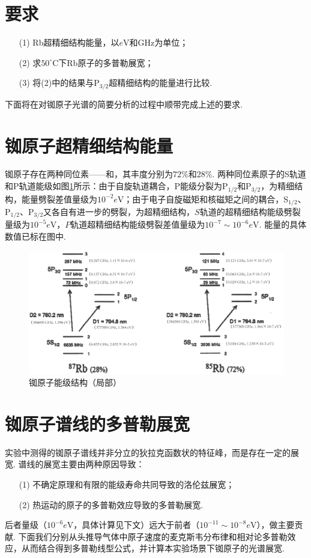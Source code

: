 \documentclass{assignment}
\begin{document}
\section*{要求}
\begin{itemize}
    \item[(1)] Rb超精细结构能量，以$e$V和GHz为单位；
    \item[(2)] 求$50^{\circ}$C下Rb原子的多普勒展宽；
    \item[(3)] 将(2)中的结果与P$_{3/2}$超精细结构的能量进行比较.
\end{itemize}
下面将在对铷原子光谱的简要分析的过程中顺带完成上述的要求.

\section{铷原子超精细结构能量}
铷原子存在两种同位素——和，其丰度分别为$72\%$和$28\%$. 两种同位素原子的S轨道和P轨道能级如图\ref{Rb-energy-level}所示：由于自旋轨道耦合，P能级分裂为P$_{1/2}$和P$_{3/2}$，为精细结构，能量劈裂差值量级为$10^{-2}e$V；由于电子自旋磁矩和核磁矩之间的耦合，S$_{1/2}$、P$_{1/2}$、P$_{3/2}$又各自有进一步的劈裂，为超精细结构，$S$轨道的超精细结构能级劈裂量级为$10^{-5}e$V，$P$轨道超精细结构能级劈裂差值量级为$10^{-7}\sim 10^{-6}e$V. 能量的具体数值已标在图中.
\begin{figure}[h]
    \centering
    \includegraphics[width=.9\textwidth]{Rb-energy-level-1.png}
    \caption{铷原子能级结构（局部）}
    \label{Rb-energy-level}
\end{figure}

\section{铷原子谱线的多普勒展宽}
实验中测得的铷原子谱线并非分立的狄拉克函数状的特征峰，而是存在一定的展宽. 谱线的展宽主要由两种原因导致：
\begin{itemize}
    \item[(1)] 不确定原理和有限的能级寿命共同导致的洛伦兹展宽；
    \item[(2)] 热运动的原子的多普勒效应导致的多普勒展宽.
\end{itemize}
后者量级（$10^{-6}e$V，具体计算见下文）远大于前者（$10^{-11}\sim 10^{-8}e$V），做主要贡献. 下面我们分别从头推导气体中原子速度的麦克斯韦分布律和相对论多普勒效应，从而结合得到多普勒线型公式，并计算本实验场景下铷原子的光谱展宽.
\end{document}
